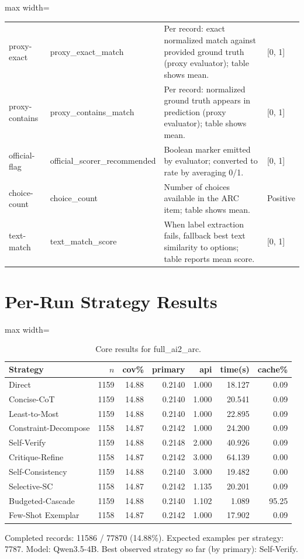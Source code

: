 \documentclass[10pt,twocolumn]{article}
\begin{document}
\begin{table}[t]
\begin{adjustbox}{max width=\textwidth}
\begin{tabular}{llll}
proxy-exact & proxy\_exact\_match & Per record: exact normalized match against provided ground truth (proxy evaluator); table shows mean. & [0, 1] \\
proxy-contains & proxy\_contains\_match & Per record: normalized ground truth appears in prediction (proxy evaluator); table shows mean. & [0, 1] \\
official-flag & official\_scorer\_recommended & Boolean marker emitted by evaluator; converted to rate by averaging 0/1. & [0, 1] \\
choice-count & choice\_count & Number of choices available in the ARC item; table shows mean. & Positive \\
text-match & text\_match\_score & When label extraction fails, fallback best text similarity to options; table reports mean score. & [0, 1] \\
\bottomrule
\end{tabular}
\end{adjustbox}
\end{table}

\section*{Per-Run Strategy Results}
\begin{table}[t]
\centering
\caption{Core results for full\_ai2\_arc.}
\label{tab:full_ai2_arc_core}
\begin{adjustbox}{max width=\textwidth}
\begin{tabular}{lrrrrrr}
\toprule
Strategy & $n$ & cov\% & primary & api & time(s) & cache\% \\
\midrule
Direct & 1159 & 14.88 & 0.2140 & 1.000 & 18.127 & 0.09 \\
Concise-CoT & 1159 & 14.88 & 0.2140 & 1.000 & 20.541 & 0.09 \\
Least-to-Most & 1159 & 14.88 & 0.2140 & 1.000 & 22.895 & 0.09 \\
Constraint-Decompose & 1158 & 14.87 & 0.2142 & 1.000 & 24.200 & 0.09 \\
Self-Verify & 1159 & 14.88 & 0.2148 & 2.000 & 40.926 & 0.09 \\
Critique-Refine & 1158 & 14.87 & 0.2142 & 3.000 & 64.139 & 0.00 \\
Self-Consistency & 1159 & 14.88 & 0.2140 & 3.000 & 19.482 & 0.00 \\
Selective-SC & 1158 & 14.87 & 0.2142 & 1.135 & 20.201 & 0.09 \\
Budgeted-Cascade & 1159 & 14.88 & 0.2140 & 1.102 & 1.089 & 95.25 \\
Few-Shot Exemplar & 1158 & 14.87 & 0.2142 & 1.000 & 17.902 & 0.09 \\
\bottomrule
\end{tabular}
\end{adjustbox}
\vspace{2pt}\parbox{0.98\textwidth}{\footnotesize Completed records: 11586 / 77870 (14.88\%). Expected examples per strategy: 7787. Model: Qwen3.5-4B. Best observed strategy so far (by primary): Self-Verify.}
\end{table}
\end{document}
